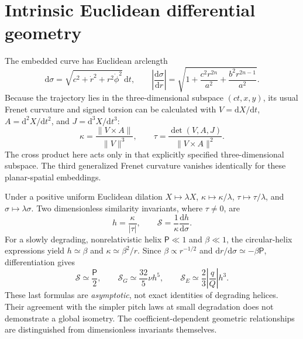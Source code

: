 \documentclass[aps,prd,reprint,onecolumn,superscriptaddress,nofootinbib]{revtex4-2}
\newcommand{\dd}{\mathrm d}
\newcommand{\PiH}{\mathsf P}
\begin{document}
\section{Intrinsic Euclidean differential geometry}
The embedded curve has Euclidean arclength
\begin{equation}
 \dd\sigma=\sqrt{c^2+\dot r^2+r^2\dot\phi^2}\,\dd t,\qquad
 \left|\frac{\dd\sigma}{\dd r}\right|=\sqrt{1+\frac{c^2r^{2n}}{a^2}+\frac{b^2r^{2n-1}}{a^2}}.\label{eq:ds}
\end{equation}
Because the trajectory lies in the three-dimensional subspace $(ct,x,y)$, its usual Frenet curvature and signed torsion can be calculated with $V=\dd X/\dd t$, $A=\dd^2X/\dd t^2$, and $J=\dd^3X/\dd t^3$:
\begin{equation}
 \kappa=\frac{\|V\times A\|}{\|V\|^3},\qquad
 \tau=\frac{\det(V,A,J)}{\|V\times A\|^2}.\label{eq:frenet}
\end{equation}
The cross product here acts only in that explicitly specified three-dimensional subspace. The third generalized Frenet curvature vanishes identically for these planar-spatial embeddings.

Under a positive uniform Euclidean dilation $X\mapsto\lambda X$, $\kappa\mapsto\kappa/\lambda$, $\tau\mapsto\tau/\lambda$, and $\sigma\mapsto\lambda\sigma$. Two dimensionless similarity invariants, where $\tau\ne0$, are
\begin{equation}
 h=\frac{\kappa}{|\tau|},\qquad
 \mathcal S=\frac{1}{\kappa}\frac{\dd h}{\dd\sigma}.\label{eq:intrinsic}
\end{equation}
For a slowly degrading, nonrelativistic helix $\PiH\ll1$ and $\beta\ll1$, the circular-helix expressions yield $h\simeq\beta$ and $\kappa\simeq\beta^2/r$. Since $\beta\propto r^{-1/2}$ and $\dd r/\dd\sigma\simeq-\beta\PiH$, differentiation gives
\begin{equation}
 \mathcal S\simeq\frac{\PiH}{2},\qquad
 \mathcal S_G\simeq\frac{32}{5}\nu h^5,\qquad
 \mathcal S_E\simeq\frac23\left|\frac qQ\right|h^3.\label{eq:S}
\end{equation}
These last formulas are \emph{asymptotic}, not exact identities of degrading helices. Their agreement with the simpler pitch laws at small degradation does not demonstrate a global isometry. The coefficient-dependent geometric relationships are distinguished from dimensionless invariants themselves.
\end{document}

